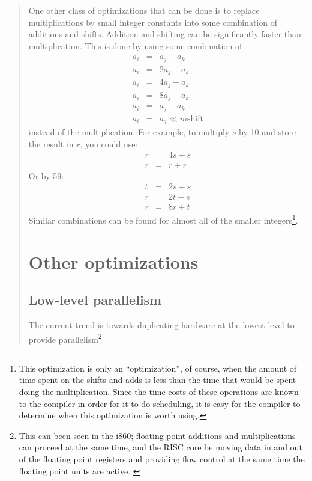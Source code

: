\begin{quote}
One other class of optimizations that can be done is to replace
multiplications by small integer constants into some combination of
additions and shifts.  Addition and shifting can be significantly faster
than multiplication.  This is done by using some combination of
\begin{eqnarray*}
a_i & = & a_j + a_k \\
a_i & = & 2a_j + a_k \\
a_i & = & 4a_j + a_k \\
a_i & = & 8a_j + a_k \\
a_i & = & a_j - a_k \\
a_i & = & a_j \ll m \mbox{shift}
\end{eqnarray*}
instead of the multiplication.  For example, to multiply $s$ by 10 and store
the result in $r$, you could use:
\begin{eqnarray*}
r & = & 4s + s\\
r & = & r + r
\end{eqnarray*}
Or by 59:
\begin{eqnarray*}
t & = & 2s + s \\
r & = & 2t + s \\
r & = & 8r + t
\end{eqnarray*}
Similar combinations can be found for almost all of the smaller
integers\footnote{This optimization is only an ``optimization'', of course,
when the amount of time spent on the shifts and adds is less than the time
that would be spent doing the multiplication.  Since the time costs of these
operations are known to the compiler in order for it to do scheduling, it is
easy for the compiler to determine when this optimization is worth using.}.
\cite{magenheimer:precision}

\section{Other optimizations}

\subsection{Low-level parallelism}

The current trend is towards duplicating hardware at the lowest level to
provide parallelism\footnote{This can been seen in the i860; floating point
additions and multiplications can proceed at the same time, and the RISC
core be moving data in and out of the floating point registers and providing
flow control at the same time the floating point units are active. \cite{byte:i860}}


\end{quote}
